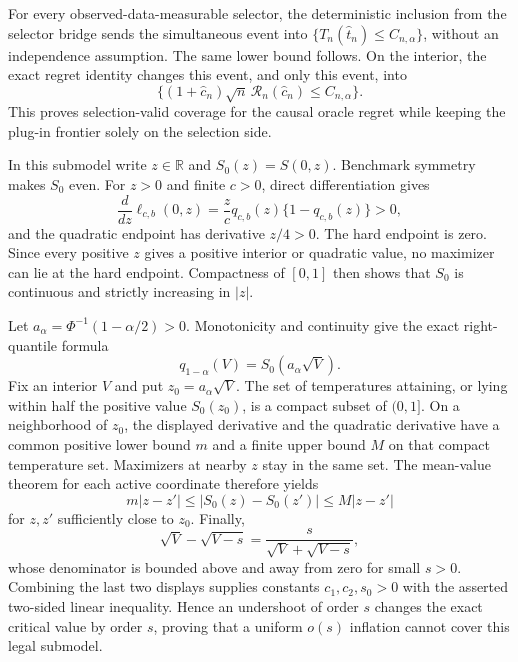 For every observed-data-measurable selector, the deterministic inclusion from the selector bridge sends the simultaneous event into \(\{T_n(\widehat t_n)\le C_{n,\alpha}\}\), without an independence assumption.  The same lower bound follows.  On the interior, the exact regret identity changes this event, and only this event, into
\[
 \{(1+\widehat c_n)\sqrt n\,\mathscr R_n(\widehat c_n)\le C_{n,\alpha}\}.
\]
This proves selection-valid coverage for the causal oracle regret while keeping the plug-in frontier solely on the selection side.

In this submodel write \(z\in\mathbb R\) and \(S_0(z)=S(0,z)\).  Benchmark symmetry makes \(S_0\) even.  For \(z>0\) and finite \(c>0\), direct differentiation gives
\[
 \frac{d}{dz}\ell_{c,b}(0,z)=\frac{z}{c}q_{c,b}(z)\{1-q_{c,b}(z)\}>0,
\]
and the quadratic endpoint has derivative \(z/4>0\).  The hard endpoint is zero.  Since every positive \(z\) gives a positive interior or quadratic value, no maximizer can lie at the hard endpoint.  Compactness of \([0,1]\) then shows that \(S_0\) is continuous and strictly increasing in \(|z|\).

Let \(a_\alpha=\Phi^{-1}(1-\alpha/2)>0\).  Monotonicity and continuity give the exact right-quantile formula
\[
 q_{1-\alpha}(V)=S_0(a_\alpha\sqrt V).
\]
Fix an interior \(V\) and put \(z_0=a_\alpha\sqrt V\).  The set of temperatures attaining, or lying within half the positive value \(S_0(z_0)\), is a compact subset of \((0,1]\).  On a neighborhood of \(z_0\), the displayed derivative and the quadratic derivative have a common positive lower bound \(m\) and a finite upper bound \(M\) on that compact temperature set.  Maximizers at nearby \(z\) stay in the same set.  The mean-value theorem for each active coordinate therefore yields
\[
 m|z-z'|\le |S_0(z)-S_0(z')|\le M|z-z'|
\]
for \(z,z'\) sufficiently close to \(z_0\).  Finally,
\[
 \sqrt V-\sqrt{V-s}=\frac{s}{\sqrt V+\sqrt{V-s}},
\]
whose denominator is bounded above and away from zero for small \(s>0\).  Combining the last two displays supplies constants \(c_1,c_2,s_0>0\) with the asserted two-sided linear inequality.  Hence an undershoot of order \(s\) changes the exact critical value by order \(s\), proving that a uniform \(o(s)\) inflation cannot cover this legal submodel.

